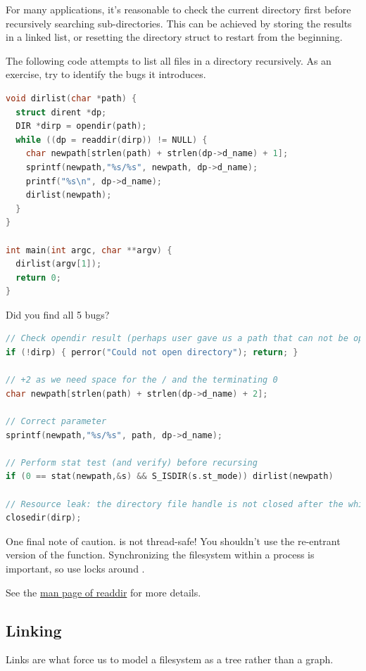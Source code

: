 For many applications, it's reasonable to check the current directory first before recursively searching sub-directories.
This can be achieved by storing the results in a linked list, or resetting the directory struct to restart from the beginning.

The following code attempts to list all files in a directory recursively.
As an exercise, try to identify the bugs it introduces.

\begin{lstlisting}[language=C]
void dirlist(char *path) {
  struct dirent *dp;
  DIR *dirp = opendir(path);
  while ((dp = readdir(dirp)) != NULL) {
    char newpath[strlen(path) + strlen(dp->d_name) + 1];
    sprintf(newpath,"%s/%s", newpath, dp->d_name);
    printf("%s\n", dp->d_name);
    dirlist(newpath);
  }
}

int main(int argc, char **argv) {
  dirlist(argv[1]);
  return 0;
}
\end{lstlisting}

Did you find all 5 bugs?

\begin{lstlisting}[language=C]
// Check opendir result (perhaps user gave us a path that can not be opened as a directory
if (!dirp) { perror("Could not open directory"); return; }

// +2 as we need space for the / and the terminating 0
char newpath[strlen(path) + strlen(dp->d_name) + 2];

// Correct parameter
sprintf(newpath,"%s/%s", path, dp->d_name);

// Perform stat test (and verify) before recursing
if (0 == stat(newpath,&s) && S_ISDIR(s.st_mode)) dirlist(newpath)

// Resource leak: the directory file handle is not closed after the while loop
closedir(dirp);
\end{lstlisting}

One final note of caution.
 is not thread-safe!
You shouldn't use the re-entrant version of the function.
Synchronizing the filesystem within a process is important, so use locks around .

See the \href{https://linux.die.net/man/3/readdir}{man page of readdir} for more details.

\subsection{Linking}

Links are what force us to model a filesystem as a tree rather than a graph.

